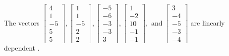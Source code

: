 \begin{exercise}
\begin{exerciseStatement}
  \end{exerciseStatement}
  \begin{exerciseAnswer}
   The vectors \(\left[\begin{array}{r}
4 \\
1 \\
-5 \\
5 \\
5
\end{array}\right] , \left[\begin{array}{r}
1 \\
1 \\
-5 \\
2 \\
2
\end{array}\right] , \left[\begin{array}{r}
-5 \\
-6 \\
-3 \\
-3 \\
3
\end{array}\right] , \left[\begin{array}{r}
1 \\
-2 \\
10 \\
-1 \\
-1
\end{array}\right] , \text{ and } \left[\begin{array}{r}
3 \\
-4 \\
-5 \\
-3 \\
-4
\end{array}\right]\) are 
  	 linearly dependent  .
  


  \end{exerciseAnswer}
\end{exercise}